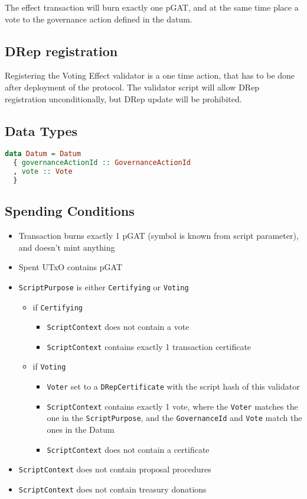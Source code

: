 \documentclass{article}
\begin{document}
The effect transaction will burn exactly one pGAT, and at the same time place a vote to the governance action defined in the datum.

\subsection*{DRep registration}

Registering the Voting Effect validator is a one time action, that has to be done after deployment of the protocol.
The validator script will allow DRep registration unconditionally, but DRep update will be prohibited.

\subsection*{Data Types}

\begin{lstlisting}[language=Haskell]
data Datum = Datum
  { governanceActionId :: GovernanceActionId
  , vote :: Vote
  }
\end{lstlisting}

\subsection*{Spending Conditions}

\begin{itemize}
  \item Transaction burns exactly 1 pGAT (symbol is known from script parameter), and doesn't mint anything
  \item Spent UTxO contains pGAT
  \item \verb|ScriptPurpose| is either \verb|Certifying| or \verb|Voting|
        \begin{itemize}
          \item if \verb|Certifying|
                \begin{itemize}
                  \item \verb|ScriptContext| does not contain a vote
                  \item \verb|ScriptContext| contains exactly 1 transaction certificate
                \end{itemize}
          \item if \verb|Voting|
                \begin{itemize}
                  \item \verb|Voter| set to a \verb|DRepCertificate| with the script hash of this validator
                  \item \verb|ScriptContext| contains exactly 1 vote, where the \verb|Voter| matches the one in the \verb|ScriptPurpose|, and the \verb|GovernanceId| and \verb|Vote| match the ones in the Datum
                  \item \verb|ScriptContext| does not contain a certificate
                \end{itemize}
        \end{itemize}
  \item \verb|ScriptContext| does not contain proposal procedures
  \item \verb|ScriptContext| does not contain treasury donations
\end{itemize}
\end{document}
